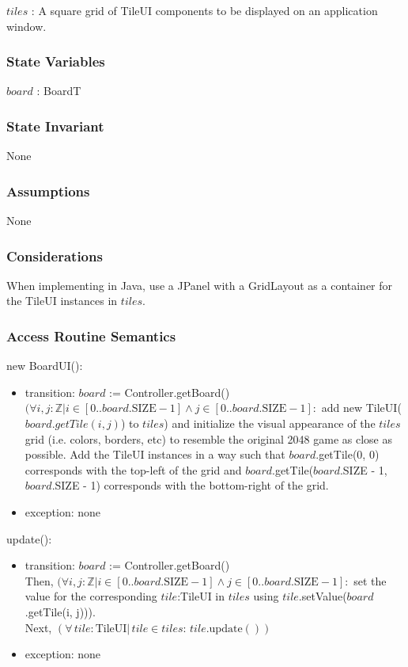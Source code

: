 \documentclass[12pt]{article}
\begin{document}
$tiles$ : A square grid of TileUI components to be displayed on an application window.

\subsubsection* {State Variables}

$board$ : BoardT

\subsubsection* {State Invariant}

None

\subsubsection* {Assumptions}

None

\subsubsection* {Considerations}

When implementing in Java, use a JPanel with a GridLayout as a container for the TileUI instances in $tiles$.

\newpage

\subsubsection* {Access Routine Semantics}

\noindent new BoardUI():
\begin{itemize}
\item transition: $board$ := Controller.getBoard() \\
$(\forall i, j:\mathbb{Z} | i \in [0..board.\text{SIZE}-1] \wedge j \in [0..board.\text{SIZE}-1]:$ add new TileUI($board.getTile(i, j)$) to $tiles$) and initialize the visual appearance of the $tiles$ grid (i.e. colors, borders, etc) to resemble the original 2048 game as close as possible. Add the TileUI instances in a way such that $board$.getTile(0, 0) corresponds with the top-left of the grid and $board$.getTile($board$.SIZE - 1, $board$.SIZE - 1) corresponds with the bottom-right of the grid.
\item exception: none
\end{itemize}

\noindent update():
\begin{itemize}
\item transition: $board$ := Controller.getBoard()\\
 Then, $(\forall i, j:\mathbb{Z} | i \in [0..board.\text{SIZE}-1] \wedge j \in [0..board.\text{SIZE}-1]:$ set the value for the corresponding $tile$:TileUI in $tiles$ using $tile$.setValue($board$.getTile(i, j))). \\
 Next, $(\forall \, tile : \text{TileUI} | \, tile \in tiles : \, tile.\text{update}())$
\item exception: none
\end{itemize}
\end{document}
